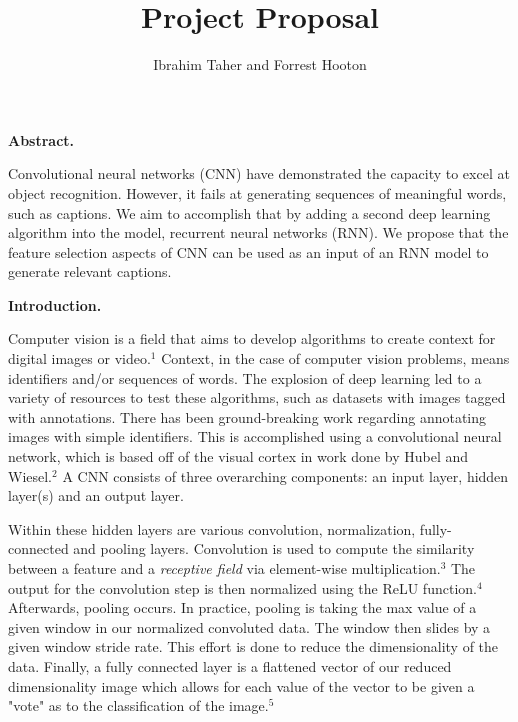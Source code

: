 \documentclass[10pt, oneside]{article}   	%
\title{Project Proposal}
\author{Ibrahim Taher and Forrest Hooton}
\begin{document}
\maketitle

\textbf{Abstract.}

Convolutional neural networks (CNN) have demonstrated the capacity to excel at object recognition. However, it fails at generating sequences of meaningful words, such as captions. We aim to accomplish that by adding a second deep learning algorithm into the model, recurrent neural networks (RNN). We propose that the feature selection aspects of CNN can be used as an input of an RNN model to generate relevant captions.

\vspace{3mm}
\textbf{Introduction.}

Computer vision is a field that aims to develop algorithms to create context for digital images or video.$^{1}$ Context, in the case of computer vision problems, means identifiers and/or sequences of words. The explosion of deep learning led to a variety of resources to test these algorithms, such as datasets with images tagged with annotations. There has been ground-breaking work regarding annotating images with simple identifiers. This is accomplished using a convolutional neural network, which is based off of the visual cortex in work done by Hubel and Wiesel.$^2$ A CNN consists of three overarching components: an input layer, hidden layer(s) and an output layer.

Within these hidden layers are various convolution, normalization, fully-connected and pooling layers. Convolution is used to compute the similarity between a feature and a \textit{receptive field} via element-wise multiplication.$^3$ The output for the convolution step is then normalized using the ReLU function.$^4$ Afterwards, pooling occurs. In practice, pooling is taking the max value of a given window in our normalized convoluted data. The window then slides by a given window stride rate. This effort is done to reduce the dimensionality of the data. Finally, a fully connected layer is a flattened vector of our reduced dimensionality image which allows for each value of the vector to be given a "vote" as to the classification of the image.$^5$
\end{document}
